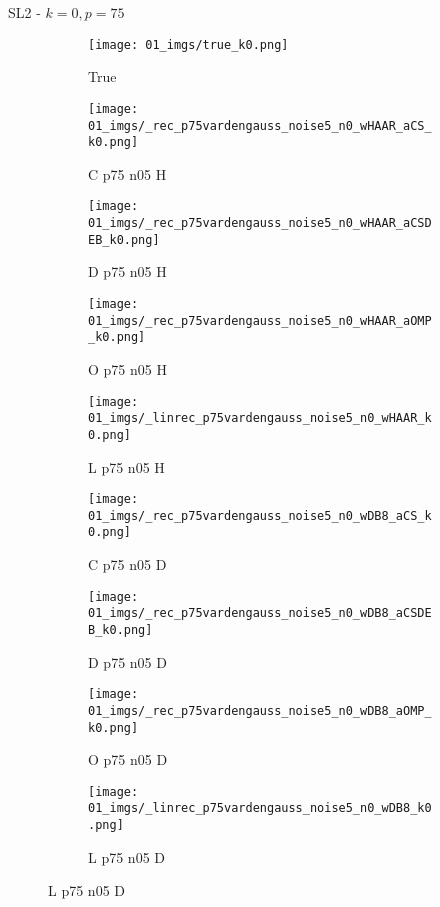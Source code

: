 \begin{frame}{SL2 - $k=0,p=75$}{}
\begin{figure}
\begin{subfigure}{0.1\textwidth}
\texttt{[image: 01\_imgs/true\_k0.png]}
\caption*{\Tiny True}
\end{subfigure}
\begin{subfigure}{0.1\textwidth}
\texttt{[image: 01\_imgs/\_rec\_p75vardengauss\_noise5\_n0\_wHAAR\_aCS\_k0.png]}
\caption*{\Tiny C p75 n05 H}
\end{subfigure}
\begin{subfigure}{0.1\textwidth}
\texttt{[image: 01\_imgs/\_rec\_p75vardengauss\_noise5\_n0\_wHAAR\_aCSDEB\_k0.png]}
\caption*{\Tiny D p75 n05 H}
\end{subfigure}
\begin{subfigure}{0.1\textwidth}
\texttt{[image: 01\_imgs/\_rec\_p75vardengauss\_noise5\_n0\_wHAAR\_aOMP\_k0.png]}
\caption*{\Tiny O p75 n05 H}
\end{subfigure}
\begin{subfigure}{0.1\textwidth}
\texttt{[image: 01\_imgs/\_linrec\_p75vardengauss\_noise5\_n0\_wHAAR\_k0.png]}
\caption*{\Tiny L p75 n05 H}
\end{subfigure}
\begin{subfigure}{0.1\textwidth}
\texttt{[image: 01\_imgs/\_rec\_p75vardengauss\_noise5\_n0\_wDB8\_aCS\_k0.png]}
\caption*{\Tiny C p75 n05 D}
\end{subfigure}
\begin{subfigure}{0.1\textwidth}
\texttt{[image: 01\_imgs/\_rec\_p75vardengauss\_noise5\_n0\_wDB8\_aCSDEB\_k0.png]}
\caption*{\Tiny D p75 n05 D}
\end{subfigure}
\begin{subfigure}{0.1\textwidth}
\texttt{[image: 01\_imgs/\_rec\_p75vardengauss\_noise5\_n0\_wDB8\_aOMP\_k0.png]}
\caption*{\Tiny O p75 n05 D}
\end{subfigure}
\begin{subfigure}{0.1\textwidth}
\texttt{[image: 01\_imgs/\_linrec\_p75vardengauss\_noise5\_n0\_wDB8\_k0.png]}
\caption*{\Tiny L p75 n05 D}
\end{subfigure}

\vspace{5pt}


\end{figure}
\end{frame}
